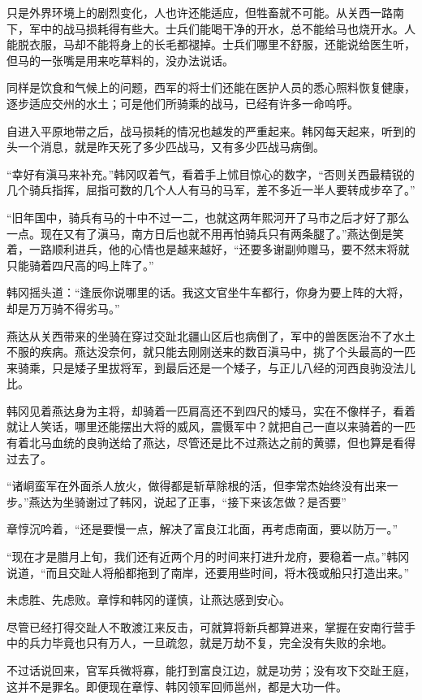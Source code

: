 只是外界环境上的剧烈变化，人也许还能适应，但牲畜就不可能。从关西一路南下，军中的战马损耗得有些大。士兵们能喝干净的开水，总不能给马也烧开水。人能脱衣服，马却不能将身上的长毛都褪掉。士兵们哪里不舒服，还能说给医生听，但马的一张嘴是用来吃草料的，没办法说话。

同样是饮食和气候上的问题，西军的将士们还能在医护人员的悉心照料恢复健康，逐步适应交州的水土；可是他们所骑乘的战马，已经有许多一命呜呼。

自进入平原地带之后，战马损耗的情况也越发的严重起来。韩冈每天起来，听到的头一个消息，就是昨天死了多少匹战马，又有多少匹战马病倒。

“幸好有滇马来补充。”韩冈叹着气，看着手上怵目惊心的数字，“否则关西最精锐的几个骑兵指挥，屈指可数的几个人人有马的马军，差不多近一半人要转成步卒了。”

“旧年国中，骑兵有马的十中不过一二，也就这两年熙河开了马市之后才好了那么一点。现在又有了滇马，南方日后也就不用再怕骑兵只有两条腿了。”燕达倒是笑着，一路顺利进兵，他的心情也是越来越好，“还要多谢副帅赠马，要不然末将就只能骑着四尺高的吗上阵了。”

韩冈摇头道：“逢辰你说哪里的话。我这文官坐牛车都行，你身为要上阵的大将，却是万万骑不得劣马。”

燕达从关西带来的坐骑在穿过交趾北疆山区后也病倒了，军中的兽医医治不了水土不服的疾病。燕达没奈何，就只能去刚刚送来的数百滇马中，挑了个头最高的一匹来骑乘，只是矮子里拔将军，到最后还是一个矮子，与正儿八经的河西良驹没法儿比。

韩冈见着燕达身为主将，却骑着一匹肩高还不到四尺的矮马，实在不像样子，看着就让人笑话，哪里还能摆出大将的威风，震慑军中？就把自己一直以来骑着的一匹有着北马血统的良驹送给了燕达，尽管还是比不过燕达之前的黄骠，但也算是看得过去了。

“诸峒蛮军在外面杀人放火，做得都是斩草除根的活，但李常杰始终没有出来一步。”燕达为坐骑谢过了韩冈，说起了正事，“接下来该怎做？是否要”

章惇沉吟着，“还是要慢一点，解决了富良江北面，再考虑南面，要以防万一。”

“现在才是腊月上旬，我们还有近两个月的时间来打进升龙府，要稳着一点。”韩冈说道，“而且交趾人将船都拖到了南岸，还要用些时间，将木筏或船只打造出来。”

未虑胜、先虑败。章惇和韩冈的谨慎，让燕达感到安心。

尽管已经打得交趾人不敢渡江来反击，可就算将新兵都算进来，掌握在安南行营手中的兵力毕竟也只有万人，一旦疏忽，就是万劫不复，完全没有失败的余地。

不过话说回来，官军兵微将寡，能打到富良江边，就是功劳；没有攻下交趾王庭，这并不是罪名。即便现在章惇、韩冈领军回师邕州，都是大功一件。

